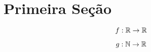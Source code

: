 \section{Primeira Seção}

\begin{equation}
	f : \mathbb{R} \rightarrow \mathbb{R}
\end{equation}

\begin{equation}
	g : \mathbb{N} \rightarrow \mathbb{R}
\end{equation}

\begin{figure}[H]
	
\end{figure}

